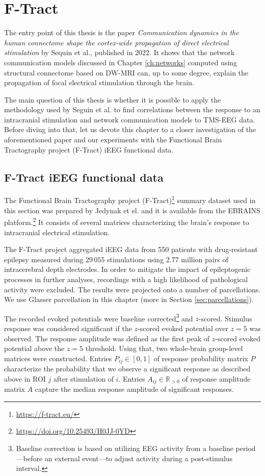 \chapter{F-Tract}\label{ch:ftract}

The entry point of this thesis is the paper \textit{Communication dynamics in the human connectome shape the cortex-wide propagation of direct electrical stimulation} by Sequin et al., published in 2022. It shows that the network communication models discussed in Chapter \ref{ch:networks} computed using structural connectome based on DW-MRI can, up to some degree, explain the propagation of focal electrical stimulation through the brain. 

The main question of this thesis is whether it is possible to apply the methodology used by Seguin et al. to find correlations between the response to an intracranial stimulation and network communication models to TMS-EEG data. Before diving into that, let us devote this chapter to a closer investigation of the aforementioned paper and our experiments with the Functional Brain Tractography project (F-Tract) iEEG functional data.  

\section{F-Tract iEEG functional data}

The Functional Brain Tractography project (F-Tract)\footnote{\url{https://f-tract.eu/}} summary dataset used in this section was prepared by Jedynak et el. \cite{jedynak_f-tract_2023} and it is available from the EBRAINS platform.\footnote{\url{https://doi.org/10.25493/H0JJ-0YD}} It consists of several matrices characterizing the brain's response to intracranial electrical stimulation.

The F-Tract project aggregated iEEG data from 550 patients with drug-resistant epilepsy measured during $29\,055$ stimulations using 2.77 million pairs of intracerebral depth electrodes. In order to mitigate the impact of epileptogenic processes in further analyses, recordings with a high likelihood of pathological activity were excluded. The results were projected onto a number of parcellations. We use Glasser parcellation in this chapter (more in Section \ref{sec:parcellations}). \cite{jedynak_f-tract_2023,seguin_communication_2023} 

The recorded evoked potentials were baseline corrected\footnote{Baseline correction is based on utilizing EEG activity from a baseline period—before an external event—to adjust activity during a post-stimulus interval.} and $z$-scored. Stimulus response was considered significant if the $z$-scored evoked potential over $z = 5$ was observed. The response amplitude was defined as the first peak of $z$-scored evoked potential above the $z = 5$ threshold. Using that, two whole-brain group-level matrices were constructed. Entries $P_{ij} \in [0,1]$ of response probability matrix $P$ characterize the probability that we observe a significant response as described above in ROI $j$ after stimulation of $i$. Entries $A_{ij} \in \mathbb{R}_{>0}$ of response amplitude matrix $A$ capture the median response amplitude of significant responses.

